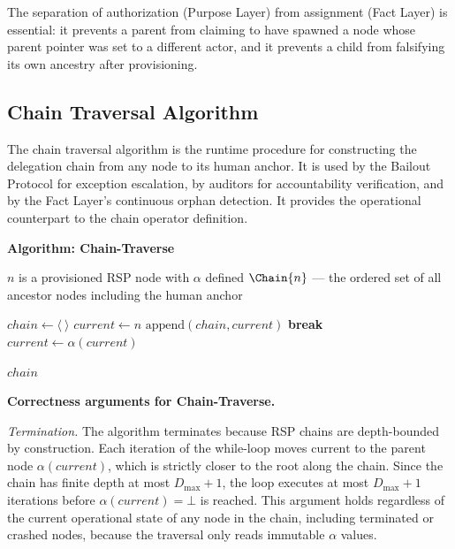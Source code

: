 The separation of authorization (Purpose Layer) from assignment (Fact Layer) is essential: it prevents a parent from claiming to have spawned a node whose parent pointer was set to a different actor, and it prevents a child from falsifying its own ancestry after provisioning.

\subsection{Chain Traversal Algorithm}
\label{sec:chain-traversal-algorithm}

The chain traversal algorithm is the runtime procedure for constructing the delegation chain from any node to its human anchor. It is used by the Bailout Protocol for exception escalation, by auditors for accountability verification, and by the Fact Layer's continuous orphan detection. It provides the operational counterpart to the chain operator definition.

\medskip
\noindent\textbf{Algorithm: Chain-Traverse}

\begin{algorithm}
\caption{Chain-Traverse($n$) — Build the delegation chain from node $n$ to the human anchor}
\label{alg:chain-traverse}
\begin{algorithmic}[1]
\REQUIRE $n$ is a provisioned RSP node with $\alpha$ defined
\ENSURE $\Chain{n}$ — the ordered set of all ancestor nodes including the human anchor

\STATE $chain \leftarrow \langle\ \rangle$ 
\STATE $current \leftarrow n$ 
    \STATE $\text{append}(chain, current)$ 
        \STATE \textbf{break} 
    \ENDIF
    \STATE $current \leftarrow \alpha(current)$ 
\ENDWHILE

\RETURN $chain$
\end{algorithmic}
\end{algorithm}

\medskip
\noindent\textbf{Correctness arguments for Chain-Traverse.}

\textit{Termination.} The algorithm terminates because RSP chains are depth-bounded by construction. Each iteration of the while-loop moves $\text{current}$ to the parent node $\alpha(current)$, which is strictly closer to the root along the chain. Since the chain has finite depth at most $D_{\max} + 1$, the loop executes at most $D_{\max} + 1$ iterations before $\alpha(current) = \bot$ is reached. This argument holds regardless of the current operational state of any node in the chain, including terminated or crashed nodes, because the traversal only reads immutable $\alpha$ values.

